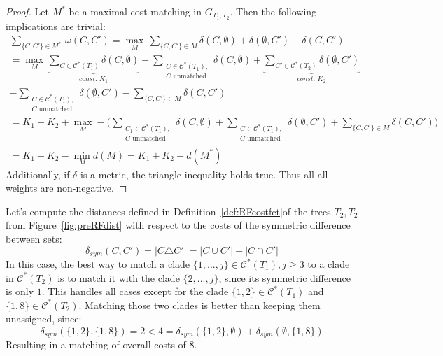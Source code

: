 \begin{proof}
Let $M^*$ be a maximal cost matching in $G_{T_1, T_2}$. Then the following implications are trivial:
\begin{gather*}
\sum_{\{C,C'\} \in M^*} \, \omega(C, C') = \max_{M} \, \sum_{\{C,C'\} \in M} \delta(C,\emptyset) + \delta(\emptyset, C') - \delta(C,C') \\
= \max_{M} \, \underbrace{\sum_{C \in \mathcal{C}^*(T_1)} \delta(C,\emptyset)}_{\textit{const. }K_1} - \sum_{\substack{C \in \mathcal{C}^*(T_1),\\ C\text{ unmatched}}} \delta(C,\emptyset) + \underbrace{\sum_{C' \in \mathcal{C}^*(T_2)} \delta(\emptyset, C')}_{\textit{const. }K_2} \\
- \sum_{\substack{C \in \mathcal{C}^*(T_1),\\ C\text{ unmatched}}} \delta(\emptyset, C') - \sum_{\{C,C'\} \in M} \delta(C,C')\\
= K_1 + K_2 + \max_{M} - \bigg( \sum_{\substack{C_1 \in \mathcal{C}^*(T_1),\\ C\text{ unmatched}}} \delta(C, \emptyset) + \sum_{\substack{C \in \mathcal{C}^*(T_1),\\ C\text{ unmatched}}} \delta(\emptyset, C') + \sum_{\{C,C'\} \in M} \delta(C,C') \bigg)\\
= K_1 + K_2 - \min_{M} d(M) = K_1 + K_2 - d(M^*)
\end{gather*}
Additionally, if $\delta$ is a metric, the triangle inequality holds true. Thus all all weights are non-negative.
\end{proof}
Let's compute the distances defined in Definition~\ref{def:RFcostfct}of the trees $T_2, T_2$ from Figure~\ref{fig:preRFdist} with respect to the costs of the symmetric difference between sets:
$$\delta_{sym}(C, C') = |C \triangle C'| = |C \cup C'| - |C \cap C'|$$
In this case, the best way to match a clade $\{1,...,j\} \in \mathcal{C}^*(T_1), j \geq 3$ to a clade in $\mathcal{C}^*(T_2)$ is to match it with the clade $\{2,...,j\}$, since its symmetric difference is only $1$. This handles all cases except for the clade $\{1,2\} \in \mathcal{C}^*(T_1)$ and $\{1,8\} \in \mathcal{C}^*(T_2)$. Matching those two clades is better than keeping them unassigned, since:
$$\delta_{sym}(\{1,2\},\{1,8\}) = 2 < 4 = \delta_{sym}(\{1,2\},\emptyset) + \delta_{sym}(\emptyset, \{1,8\})$$
Resulting in a matching of overall costs of $8$. 

